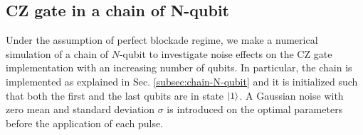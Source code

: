 \documentclass[rmp,10pt,onecolumn,fleqn,notitlepage]{revtex4-1}
\begin{document}
\subsection{CZ gate in a chain of N-qubit}

Under the assumption of perfect blockade regime, we make a numerical simulation of a chain of $N$-qubit to investigate noise effects on the CZ gate implementation with an increasing number of qubits. In particular, the chain is implemented as explained in Sec. \ref{subsec:chain-N-qubit} and it is initialized such that both the first and the last qubits are in state $\left\vert{1}\right\rangle$. 
A Gaussian noise with zero mean and standard deviation $\sigma$ is introduced on the optimal parameters before the application of each pulse.

\begin{figure}[H]
\begin{minipage}[c]{0.49\linewidth}
\end{minipage}
\begin{minipage}[]{0.49\linewidth}
\centering
{}

\end{minipage}
\end{figure}
\end{document}
